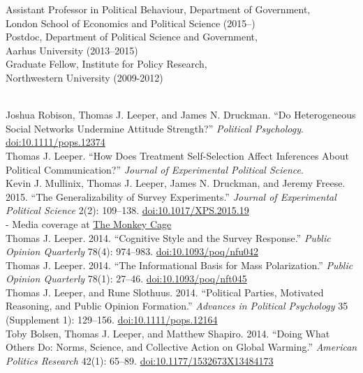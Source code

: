 \documentclass[12pt]{article}
\renewcommand{\section}[1]{\pagebreak[3]%
    \llap{\scshape\smash{\parbox[t]{\marginparwidth}{\raggedright {\color{lg}#1}}}}%
    \vspace{-\baselineskip}\par}
\newcommand{\topic}[1]{\pagebreak[3]\indent {\color{lg}{\footnotesize #1 }}\\}
\newcommand{\entry}[1]{\indent {\color{lg}\guillemotright}\hspace{2pt}#1\vspace{.25em}\\}
\newcommand{\subentry}[1]{{\color{lg}-} #1\vspace{.25em}\\}
\begin{document}
\section{Academic Appointments}
\entry{Assistant Professor in Political Behaviour, Department of Government,\\ London School of Economics and Political Science (2015--)}
\entry{Postdoc, Department of Political Science and Government,\\ Aarhus University (2013--2015)}
\entry{Graduate Fellow, Institute for Policy Research,\\ Northwestern University (2009-2012)}

\section{Publications}
\topic{Peer-Reviewed Publications: Political Science}
	\entry{Joshua Robison, Thomas J. Leeper, and James N. Druckman. ``Do Heterogeneous Social Networks Undermine Attitude Strength?'' \textit{Political Psychology}. \href{http://doi.org/10.1111/pops.12374}{doi:10.1111/pops.12374}}
	\entry{Thomas J. Leeper. ``How Does Treatment Self-Selection Affect Inferences About Political Communication?'' \textit{Journal of Experimental Political Science}.}
	\entry{Kevin J. Mullinix, Thomas J. Leeper, James N. Druckman, and Jeremy Freese. 2015. ``The Generalizability of Survey Experiments.'' \textit{Journal of Experimental Political Science} 2(2): 109--138. \href{http://doi.org/10.1017/XPS.2015.19}{doi:10.1017/XPS.2015.19}}
		\subentry{Media coverage at \href{https://www.washingtonpost.com/news/monkey-cage/wp/2016/03/09/does-social-science-have-a-replication-crisis/}{The Monkey Cage}}
	\entry{Thomas J. Leeper. 2014. ``Cognitive Style and the Survey Response.'' \textit{Public Opinion Quarterly} 78(4): 974--983. \href{http://doi.org/10.1093/poq/nfu042}{doi:10.1093/poq/nfu042}}
	\entry{Thomas J. Leeper. 2014. ``The Informational Basis for Mass Polarization.'' \textit{Public Opinion Quarterly} 78(1): 27--46. \href{http://doi.org/10.1093/poq/nft045}{doi:10.1093/poq/nft045}}
	\entry{Thomas J. Leeper, and Rune Slothuus. 2014. ``Political Parties, Motivated Reasoning, and Public Opinion Formation.'' \textit{Advances in Political Psychology} 35 (Supplement 1): 129--156. \href{http://doi.org/10.1111/pops.12164}{doi:10.1111/pops.12164}}
	\entry{Toby Bolsen, Thomas J. Leeper, and Matthew Shapiro. 2014. ``Doing What Others Do: Norms, Science, and Collective Action on Global Warming.'' \textit{American Politics Research} 42(1): 65--89. \href{http://doi.org/10.1177/1532673X13484173}{doi:10.1177/1532673X13484173}}
\end{document}
